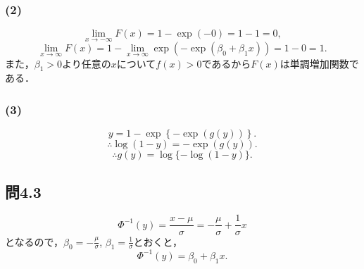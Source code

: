 \documentclass[pdflatex,ja=standard]{bxjsarticle}
\begin{document}
\subsubsection*{(2)}
\begin{equation}
    \lim_{x \rightarrow - \infty} F(x) = 1 - \exp(-0) = 1-1 = 0,
\end{equation}
\begin{equation}
    \lim_{x \rightarrow \infty} F(x) = 1 - \lim_{x \rightarrow \infty} \exp(-\exp(\beta_0 + \beta_1 x)) = 1-0 = 1.
\end{equation}
また，$\beta_1 > 0$より任意の$x$について$f(x) > 0$であるから$F(x)$は単調増加関数である．

\subsubsection*{(3)}
\begin{equation}
    y = 1 - \exp \left\{ - \exp(g(y)) \right\}.
\end{equation}
\begin{equation}
    \therefore \log (1-y) = - \exp(g(y)).
\end{equation}
\begin{equation}
    \therefore g(y) = \log \{ - \log (1-y) \}.
\end{equation}

\subsection*{問4.3}
\begin{equation}
    \Phi^{-1} (y) = \frac{x-\mu}{\sigma} = - \frac{\mu}{\sigma} + \frac{1}{\sigma} x
\end{equation}
となるので，$\beta_0 = - \frac{\mu}{\sigma}$, $\beta_1 = \frac{1}{\sigma}$とおくと，
\begin{equation}
    \Phi^{-1} (y) = \beta_0 + \beta_1 x.
\end{equation}
\end{document}
